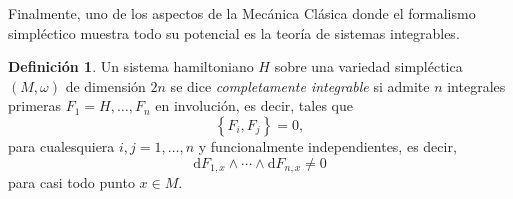\documentclass[12pt,a4paper,twocolumn,reqno]{amsart}
\theoremstyle{definition} \newtheorem{defn}[thm]{Definición}
\theoremstyle{definition} \newtheorem{ejemplo}[thm]{Ejemplo}
\theoremstyle{definition} \newtheorem{ejercicio}[thm]{Ejercicio}
\theoremstyle{remark} \newtheorem*{obs}{Observación}
\def\dd{\mathrm{d}}
\begin{document}
  Finalmente, uno de los aspectos de la Mecánica Clásica donde el formalismo simpléctico muestra todo su potencial es la teoría de sistemas integrables. 
  \begin{defn}
    Un sistema hamiltoniano $H$ sobre una variedad simpléctica $(M,\omega)$ de dimensión $2n$ se dice \emph{completamente integrable} si admite $n$ integrales primeras $F_1=H,\dots,F_n$ en involución, es decir, tales que
    \begin{equation}
      \left\{ F_i,F_j \right\}=0,  
    \end{equation}
    para cualesquiera $i,j=1,\dots,n$ y funcionalmente independientes, es decir,
    \begin{equation}
      \dd F_{1,x} \wedge \cdots \wedge \dd F_{n,x}\neq 0
    \end{equation}
    para casi todo punto $x\in M$.
  \end{defn}
\end{document}
